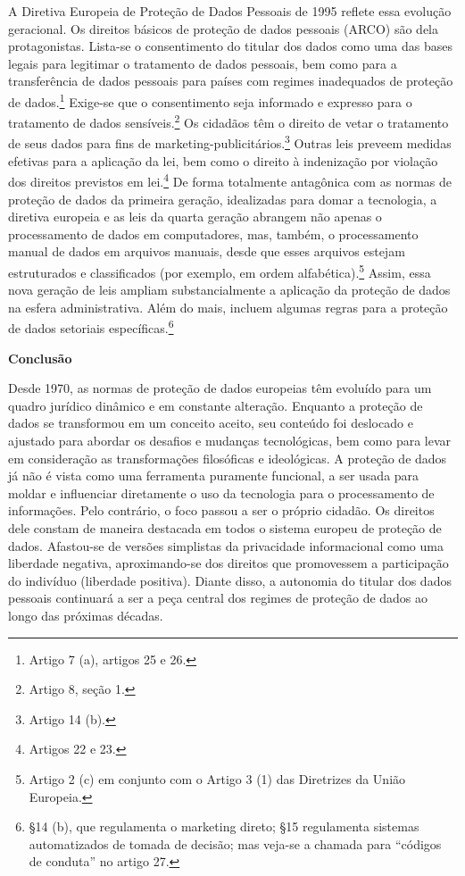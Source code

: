 A Diretiva Europeia de Proteção de Dados Pessoais de 1995 reflete essa
evolução geracional. Os direitos básicos de proteção de dados pessoais
(ARCO) são dela protagonistas. Lista-se o consentimento do titular dos
dados como uma das bases legais para legitimar o tratamento de dados
pessoais, bem como para a transferência de dados pessoais para países
com regimes inadequados de proteção de dados.\footnote{Artigo 7 (a),
  artigos 25 e 26.} Exige-se que o consentimento seja informado e
expresso para o tratamento de dados sensíveis.\footnote{Artigo 8, seção
  1.} Os cidadãos têm o direito de vetar o tratamento de seus dados para
fins de marketing-publicitários.\footnote{Artigo 14 (b).} Outras leis
preveem medidas efetivas para a aplicação da lei, bem como o direito à
indenização por violação dos direitos previstos em lei.\footnote{Artigos
  22 e 23.} De forma totalmente antagônica com as normas de proteção de
dados da primeira geração, idealizadas para domar a tecnologia, a
diretiva europeia e as leis da quarta geração abrangem não apenas o
processamento de dados em computadores, mas, também, o processamento
manual de dados em arquivos manuais, desde que esses arquivos estejam
estruturados e classificados (por exemplo, em ordem
alfabética).\footnote{Artigo 2 (c) em conjunto com o Artigo 3 (1) das
  Diretrizes da União Europeia.} Assim, essa nova geração de leis
ampliam substancialmente a aplicação da proteção de dados na esfera
administrativa. Além do mais, incluem algumas regras para a proteção de
dados setoriais específicas.\footnote{§14 (b), que regulamenta o
  marketing direto; §15 regulamenta sistemas automatizados de tomada de
  decisão; mas veja-se a chamada para ``códigos de conduta'' no artigo
  27.}

\textbf{Conclusão}

Desde 1970, as normas de proteção de dados europeias têm evoluído para
um quadro jurídico dinâmico e em constante alteração. Enquanto a
proteção de dados se transformou em um conceito aceito, seu conteúdo foi
deslocado e ajustado para abordar os desafios e mudanças tecnológicas,
bem como para levar em consideração as transformações filosóficas e
ideológicas. A proteção de dados já não é vista como uma ferramenta
puramente funcional, a ser usada para moldar e influenciar diretamente o
uso da tecnologia para o processamento de informações. Pelo contrário, o
foco passou a ser o próprio cidadão. Os direitos dele constam de maneira
destacada em todos o sistema europeu de proteção de dados. Afastou-se de
versões simplistas da privacidade informacional como uma liberdade
negativa, aproximando-se dos direitos que promovessem a participação do
indivíduo (liberdade positiva). Diante disso, a autonomia do titular dos
dados pessoais continuará a ser a peça central dos regimes de proteção
de dados ao longo das próximas décadas.

